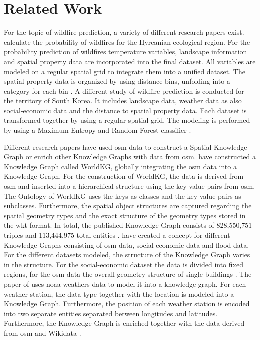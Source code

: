 \documentclass[
]{ceurart}
\begin{document}
\section{Related Work} \label{sec:RelatedWork}
For the topic of wildfire prediction, a variety of different research papers exist. \textcite{Nami.2018} calculate the probability of wildfires for the Hyrcanian ecological region. For the probability prediction of wildfires temperature variables, landscape information and spatial property data are incorporated into the final dataset. All variables are modeled on a regular spatial grid to integrate them into a unified dataset. The spatial property data is organized by using distance bins, unfolding into a category for each bin \cite{Nami.2018}. A different study of wildfire prediction is conducted for the territory of South Korea. It includes landscape data, weather data as also social-economic data and the distance to spatial property data. Each dataset is transformed together by using a regular spatial grid. The modeling is performed by using a Maximum Entropy and Random Forest classifier \cite{Kim.2019}.

Different research papers have used \gls*{osm} data to construct a Spatial Knowledge Graph or enrich other Knowledge Graphs with data from \gls*{osm}. \textcite{Dsouza.2021} have constructed a Knowledge Graph called WorldKG, globally integrating the \gls*{osm} data into a Knowledge Graph. For the construction of WorldKG, the data is derived from \gls*{osm} and inserted into a hierarchical structure using the key-value pairs from \gls*{osm}. The Ontology of WorldKG uses the keys as classes and the key-value pairs as subclasses. Furthermore, the spatial object structures are captured regarding the spatial geometry types and the exact structure of the geometry types stored in the \gls*{wkt} format. In total, the published Knowledge Graph consists of 828,550,751 triples and 113,444,975 total entities \cite{Demartini.2021}. \textcite{Johnson.2022} have created a concept for different Knowledge Graphs consisting of \gls*{osm} data, social-economic data and flood data. For the different datasets modeled, the structure of the Knowledge Graph varies in the structure. For the social-economic dataset the data is divided into fixed regions, for the \gls*{osm} data the overall geometry structure of single buildings \cite{Johnson.2022}. The paper of \textcite{Wu.2022} uses \gls*{noaa} weathers data to model it into a knowledge graph. For each weather station, the data type together with the location is modeled into a Knowledge Graph. Furthermore, the position of each weather station is encoded into two separate entities separated between longitudes and latitudes. Furthermore, the Knowledge Graph is enriched together with the data derived from \gls*{osm} and Wikidata \cite{Wu.2022}.
\end{document}
